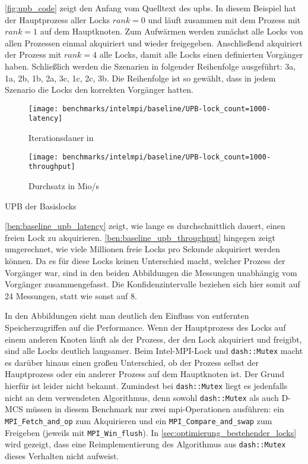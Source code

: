 \autoref{fig:upb_code} zeigt den Anfang vom Quelltext des \gls{upb}s.
In diesem Beispiel hat der Hauptprozess aller Locks $rank = 0$
und läuft zusammen mit dem Prozess mit $rank = 1$ auf dem Hauptknoten.
Zum Aufwärmen werden zunächst alle Locks von allen Prozessen einmal akquiriert und wieder freigegeben.
Anschließend akquiriert der Prozess mit $rank = 4$ alle Locks,
damit alle Locks einen definierten Vorgänger haben.
Schließlich werden die Szenarien in folgender Reihenfolge ausgeführt: 3a, 1a, 2b, 1b, 2a, 3c, 1c, 2c, 3b.
Die Reihenfolge ist so gewählt,
dass in jedem Szenario die Locks den korrekten Vorgänger hatten.

\begin{benchmark}[h]
    \begin{subfigure}{.5\textwidth}
        \texttt{[image: benchmarks/intelmpi/baseline/UPB-lock\_count=1000-latency]}
        \caption{Iterationsdauer in }
        \label{ben:baseline_upb_latency}
    \end{subfigure}
    \begin{subfigure}{.5\textwidth}
        \texttt{[image: benchmarks/intelmpi/baseline/UPB-lock\_count=1000-throughput]}
        \caption{Durchsatz in Mio/s}
        \label{ben:baseline_upb_throughput}
    \end{subfigure}
    \caption{UPB der Basislocks}
    \label{ben:baseline_upb}
\end{benchmark}

\autoref{ben:baseline_upb_latency} zeigt,
wie lange es durchschnittlich dauert,
einen freien Lock zu akquirieren.
\autoref{ben:baseline_upb_throughput} hingegen zeigt umgerechnet,
wie viele Millionen freie Locks pro Sekunde akquiriert werden können.
Da es für diese Locks keinen Unterschied macht,
welcher Prozess der Vorgänger war,
sind in den beiden Abbildungen die Messungen unabhängig vom Vorgänger zusammengefasst.
Die Konfidenzintervalle beziehen sich hier somit auf 24 Messungen,
statt wie sonst auf 8.

In den Abbildungen sieht man deutlich den Einfluss von entfernten Speicherzugriffen auf die Performance.
Wenn der Hauptprozess des Locks auf einem anderen Knoten läuft
als der Prozess,
der den Lock akquiriert und freigibt,
sind alle Locks deutlich langsamer.
Beim Intel-MPI-Lock und \texttt{dash::Mutex} macht es darüber hinaus einen großen Unterschied,
ob der Prozess selbst der Hauptprozess
oder ein anderer Prozess auf dem Hauptknoten ist.
Der Grund hierfür ist leider nicht bekannt.
Zumindest bei \texttt{dash::Mutex} liegt es jedenfalls nicht an dem verwendeten Algorithmus,
denn sowohl \texttt{dash::Mutex}
als auch D-MCS müssen in diesem Benchmark nur zwei \gls{mpi}-Operationen ausführen:
ein \texttt{MPI\_Fetch\_and\_op} zum Akquirieren
und ein \texttt{MPI\_Compare\_and\_swap} zum Freigeben (jeweils mit \texttt{MPI\_Win\_flush}).
In \autoref{sec:optimierung_bestehender_locks} wird gezeigt,
dass eine Reimplementierung des Algorithmus aus \texttt{dash::Mutex} dieses Verhalten nicht aufweist.

